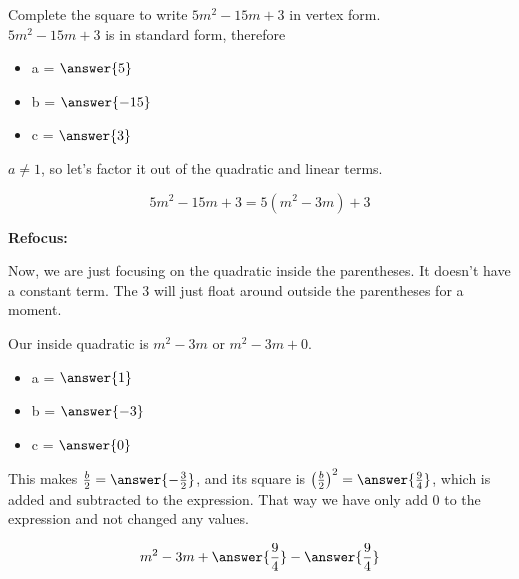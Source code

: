 \documentclass{ximera}
\author{Lee Wayand}
\begin{document}
\begin{exercise} 


Complete the square to write $5m^2 - 15m + 3$ in vertex form. \\



$5m^2 - 15m + 3$ is in standard form, therefore



\begin{itemize}
\item  a = $\answer{5}$ \\
\item  b = $\answer{-15}$ \\
\item  c = $\answer{3}$ \\
\end{itemize}




$a \ne 1$, so let's factor it out of the quadratic and linear terms.



\[   5m^2 - 15m + 3 = 5(m^2 - 3m) + 3   \]




\begin{procedure} \textbf{Refocus:}  


Now, we are just focusing on the quadratic inside the parentheses.  It doesn't have a constant term.  The $3$ will just float around outside the parentheses for a moment.



Our inside quadratic is $m^2 - 3m$ or $m^2 - 3m + 0$.


\begin{itemize}
\item  a = $\answer{1}$ \\
\item  b = $\answer{-3}$ \\
\item  c = $\answer{0}$ \\
\end{itemize}



This makes $\frac{b}{2} = \answer{-\frac{3}{2}}$, and its square is $\left( \frac{b}{2} \right)^2 = \answer{\frac{9}{4}}$, which is added and subtracted to the expression.  That way we have only add $0$ to the expression and not changed any values. 


\[ m^2 - 3m + \answer{\frac{9}{4}} - \answer{\frac{9}{4}} \]




\end{procedure}
\end{exercise}
\end{document}
